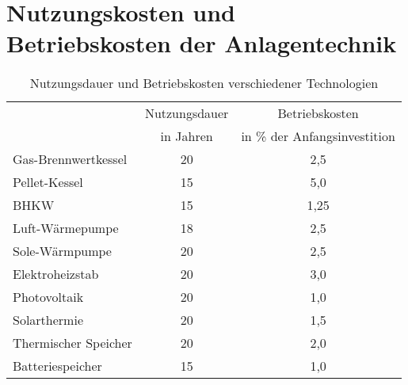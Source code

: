 \section{Nutzungskosten und Betriebskosten der Anlagentechnik}

\begin{table}[H]\centering
\begin{tabular}{|l|c|c|}
\hline
\rowcolor[HTML]{C0C0C0} 
\cellcolor[HTML]{C0C0C0} & Nutzungsdauer & Betriebskosten \\ \cline{2-3} 
\rowcolor[HTML]{C0C0C0} 
\multirow{-2}{*}{\cellcolor[HTML]{C0C0C0}Technologie} & in Jahren & in \% der Anfangsinvestition \\ \hline
Gas-Brennwertkessel & 20 & 2,5 \\ \hline
\rowcolor[HTML]{EFEFEF} 
Pellet-Kessel & 15 & 5,0 \\ \hline
BHKW & 15 & 1,25 \\ \hline
\rowcolor[HTML]{EFEFEF} 
Luft-Wärmepumpe & 18 & 2,5 \\ \hline
Sole-Wärmpumpe & 20 & 2,5 \\ \hline
\rowcolor[HTML]{EFEFEF} 
Elektroheizstab & 20 & 3,0 \\ \hline
Photovoltaik & 20 & 1,0 \\ \hline
\rowcolor[HTML]{EFEFEF} 
Solarthermie & 20 & 1,5 \\ \hline
Thermischer Speicher & 20 & 2,0 \\ \hline
\rowcolor[HTML]{EFEFEF} 
Batteriespeicher & 15 & 1,0 \\ \hline
\end{tabular}
\caption{Nutzungsdauer und Betriebskosten verschiedener Technologien}
\label{tab: TabelleA5}
\end{table}

